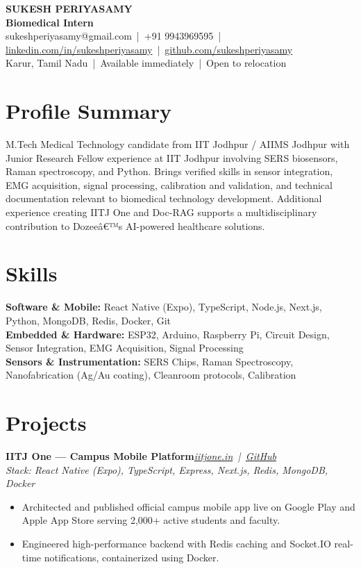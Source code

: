 \documentclass[9.2pt,a4paper]{article}
\newcommand{\role}[3]{\textbf{#1}\hfill\textit{#2}\\[-2pt]\textit{\small #3}\par}
\begin{document}
\begin{center}
{\huge\bfseries SUKESH PERIYASAMY}\\[1.5pt]
{\large\bfseries\color{accent} Biomedical Intern}\\[1.5pt]
\small sukeshperiyasamy@gmail.com \,|\, +91 9943969595 \,|\, \href{https://linkedin.com/in/sukeshperiyasamy}{linkedin.com/in/sukeshperiyasamy} \,|\, \href{https://github.com/sukeshperiyasamy}{github.com/sukeshperiyasamy}\\
Karur, Tamil Nadu \,|\, Available immediately \,|\, Open to relocation
\end{center}

\section{Profile Summary}
M.Tech Medical Technology candidate from IIT Jodhpur / AIIMS Jodhpur with Junior Research Fellow experience at IIT Jodhpur involving SERS biosensors, Raman spectroscopy, and Python. Brings verified skills in sensor integration, EMG acquisition, signal processing, calibration and validation, and technical documentation relevant to biomedical technology development. Additional experience creating IITJ One and Doc-RAG supports a multidisciplinary contribution to Dozeeâ€™s AI-powered healthcare solutions.

\section{Skills}
\textbf{Software \& Mobile:} React Native (Expo), TypeScript, Node.js, Next.js, Python, MongoDB, Redis, Docker, Git\\
\textbf{Embedded \& Hardware:} ESP32, Arduino, Raspberry Pi, Circuit Design, Sensor Integration, EMG Acquisition, Signal Processing\\
\textbf{Sensors \& Instrumentation:} SERS Chips, Raman Spectroscopy, Nanofabrication (Ag/Au coating), Cleanroom protocols, Calibration

\section{Projects}
\role{IITJ One --- Campus Mobile Platform}{\href{https://iitjone.in}{iitjone.in} \,|\, \href{https://github.com/Godevs04/IITJ_One}{GitHub}}{Stack: React Native (Expo), TypeScript, Express, Next.js, Redis, MongoDB, Docker}
\begin{itemize}
  \item Architected and published official campus mobile app live on Google Play and Apple App Store serving 2,000+ active students and faculty.
  \item Engineered high-performance backend with Redis caching and Socket.IO real-time notifications, containerized using Docker.
\end{itemize}
\end{document}
